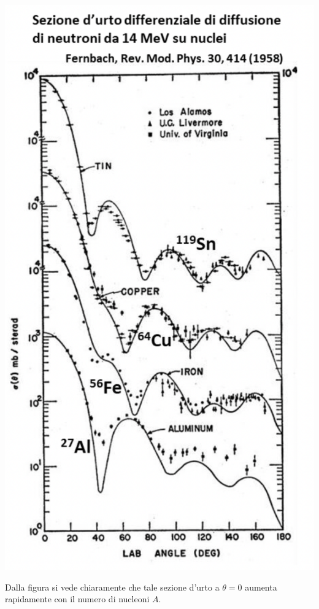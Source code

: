 \begin{marginfigure}
	\centering
	\includegraphics[width = 1.25 \textwidth,height = 1.25 \textheight]{figs/grafico-cross-sect-neutroni-2}
	\label{fig:cross-section-neutroni2}
\end{marginfigure}
Dalla figura si vede chiaramente che tale sezione d'urto a $\theta=0$ aumenta rapidamente con il numero di nucleoni $A$.

